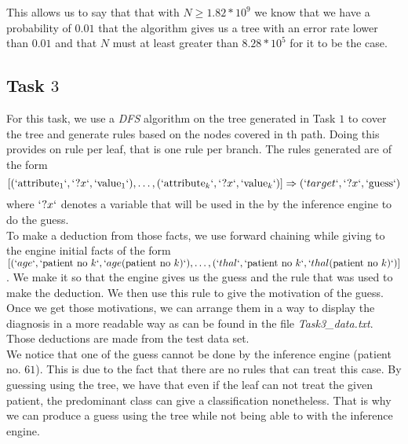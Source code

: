 \documentclass[french]{article}
\begin{document}
This allows us to say that that with $N\geq1.82*10^9$ we know that we have a probability of $0.01$ that the algorithm gives us a tree with an error rate lower than $0.01$ and that $N$ must at least greater than $8.28*10^5$ for it to be the case.

\subsection{Task $3$}
	For this task, we use a \emph{DFS} algorithm on the tree generated in Task $1$ to cover the tree and generate rules based on the nodes covered in th path. Doing this provides on rule per leaf, that is one rule per branch. The rules generated are of the form $$ [(`\mathrm{attribute}_1`,` ?x`, `\mathrm{value}_1`),\ldots,(`\mathrm{attribute}_k`,` ?x`, `\mathrm{value}_k`)]\Rightarrow(`target`, `?x` , `\mathrm{guess}`)$$ where $`?x`$ denotes a variable that will be used in the by the inference engine to do the guess.\\
	To make a deduction from those facts, we use forward chaining while giving to the engine initial facts of the form $[(`age`, `\mathrm{patient\ no}\ k`, `age(\mathrm{patient\ no}\ k)`),\ldots,(`thal`, `\mathrm{patient\ no}\ k`, `thal(\mathrm{patient\ no}\ k)`)]$. We make it so that the engine gives us the guess and the rule that was used to make the deduction. We then use this rule to give the motivation of the guess. Once we get those motivations, we can arrange them in a way to display the diagnosis in a more readable way as can be found in the file \emph{Task3\_data.txt}. Those deductions are made from the test data set.\\
	We notice that one of the guess cannot be done by the inference engine (patient no. $61$). This is due to the fact that there are no rules that can treat this case. By guessing using the tree, we have that even if the leaf can not treat the given patient, the predominant class can give a classification nonetheless. That is why we can produce a guess using the tree while not being able to with the inference engine.
	
\end{document}
